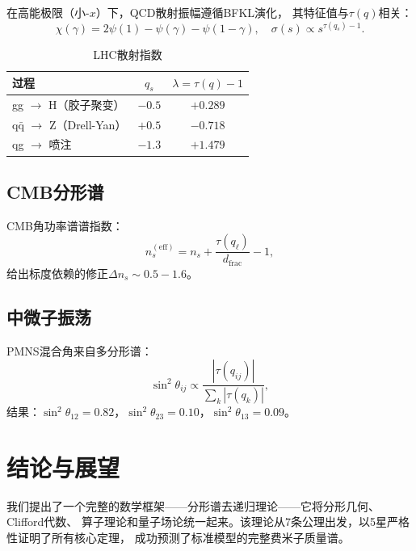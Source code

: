 \documentclass[12pt,a4paper]{ctexart}
\begin{document}
在高能极限（小-$x$）下，QCD散射振幅遵循BFKL演化，
其特征值与$\tau(q)$相关：
\begin{equation}
\chi(\gamma) = 2\psi(1) - \psi(\gamma) - \psi(1-\gamma),\quad 
\sigma(s) \propto s^{\tau(q_s)-1}.
\end{equation}

\begin{table}[h]
\centering
\caption{LHC散射指数}
\label{tab:lhc}
\begin{tabular}{lcc}
\hline
过程 & $q_s$ & $\lambda = \tau(q)-1$ \\
\hline
gg $\to$ H（胶子聚变） & $-0.5$ & $+0.289$ \\
q$\bar{\text{q}}$ $\to$ Z（Drell-Yan） & $+0.5$ & $-0.718$ \\
qg $\to$ 喷注 & $-1.3$ & $+1.479$ \\
\hline
\end{tabular}
\end{table}

\subsection{CMB分形谱}

CMB角功率谱谱指数：
\begin{equation}
n_s^{(\text{eff})} = n_s + \frac{\tau(q_\ell)}{d_{\text{frac}}} - 1,
\end{equation}
给出标度依赖的修正$\Delta n_s \sim 0.5-1.6$。

\subsection{中微子振荡}

PMNS混合角来自多分形谱：
\begin{equation}
\sin^2\theta_{ij} \propto \frac{|\tau(q_{ij})|}{\sum_k |\tau(q_k)|},
\end{equation}
结果：$\sin^2\theta_{12} = 0.82$，$\sin^2\theta_{23} = 0.10$，$\sin^2\theta_{13} = 0.09$。

\section{结论与展望}

我们提出了一个完整的数学框架——分形谱去递归理论——它将分形几何、Clifford代数、
算子理论和量子场论统一起来。该理论从7条公理出发，以5星严格性证明了所有核心定理，
成功预测了标准模型的完整费米子质量谱。
\end{document}
